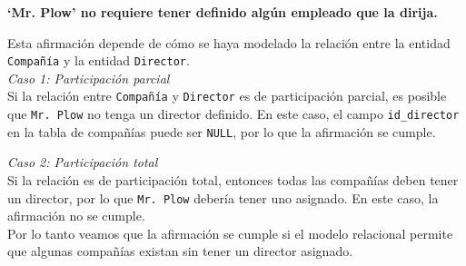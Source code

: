 \textbf{‘Mr. Plow’ no requiere tener definido algún empleado que la dirija.}\vspace{.3cm}

Esta afirmación depende de cómo se haya modelado la relación entre la entidad \texttt{Compañía} y la entidad \texttt{Director}. \\

\textit{Caso 1: Participación parcial} \\

Si la relación entre \texttt{Compañía} y \texttt{Director} es de participación parcial, es posible que \texttt{Mr. Plow} no tenga un director definido. En este caso, el campo \texttt{id\_director} en la tabla de compañías puede ser \texttt{NULL}, por lo que la afirmación se cumple.

\textit{Caso 2: Participación total} \\

Si la relación es de participación total, entonces todas las compañías deben tener un director, por lo que \texttt{Mr. Plow} debería tener uno asignado. En este caso, la afirmación no se cumple. \\


Por lo tanto veamos que la afirmación se cumple si el modelo relacional permite que algunas compañías existan sin tener un director asignado.
